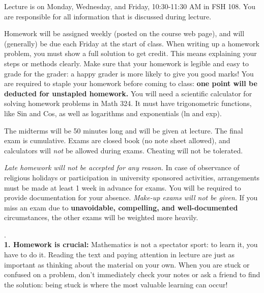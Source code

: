 \documentclass[11 pt]{report}
\begin{document}
\vspace{0.25cm}

  Lecture is on Monday, Wednesday, and Friday, 10:30-11:30 AM in FSH 108.  You
are responsible for all information that is discussed
during lecture.
\vspace{0.25cm}

  Homework will be assigned weekly (posted on the course web page), and will (generally) be due each Friday at the start of class. When writing up a homework problem, you must show a full solution to get credit. This means explaining your steps or methods clearly. Make sure that your homework is legible and easy to grade for the grader: a happy grader is more likely to give you good marks! You are required to staple your homework before coming to class: {\bf one point will be deducted for unstapled homework.} You will need a scientific calculator for solving homework problems in Math 324.  It must have trigonometric functions, like
Sin and Cos, as well as logarithms and exponentials (ln and exp).
\vspace{0.25cm}


  The midterms will be 50 minutes long and
will be given at lecture.  The final exam is cumulative. Exams are closed book (no note sheet allowed), 
and calculators will \emph{not} be allowed during exams. Cheating will not be tolerated. 

\vspace{.25cm}

  \emph{Late homework will not be accepted
for any reason.}  In case of observance of religious holidays or
participation in university sponsored activities, arrangements must
be made at least 1 week in advance for exams. You will be required
to provide documentation for your absence. \emph{Make-up exams will
not be given}.  If you miss an exam due to {\bf unavoidable,
compelling, and well-documented} circumstances, the other exams will
be weighted more heavily. \vspace{0.25cm}

\newpage 

. \\
{\bf1.  Homework is crucial:} Mathematics is not a spectator sport: to learn it, you have to do it.
Reading the text and paying attention in lecture are just as important as thinking about
the material on your own. When you are stuck or confused on a problem, don't immediately check your notes or 
ask a friend to find the solution: being stuck is where the most valuable learning can occur! 
\end{document}
